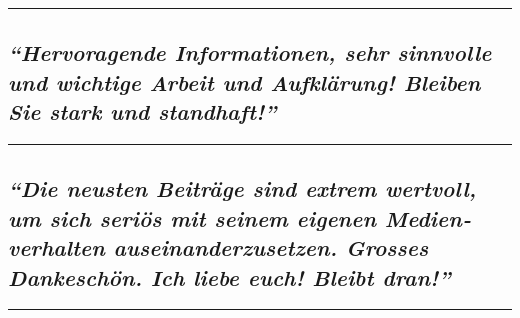 \begin{center}\rule{0.5\linewidth}{\linethickness}\end{center}

\hypertarget{hervoragende-informationen-sehr-sinnvolle-und-wichtige-arbeit-und-aufkluxe4rung-bleiben-sie-stark-und-standhaft}{%
\subsection{\texorpdfstring{\emph{``Hervoragende Informationen, sehr
sinnvolle und wichtige Arbeit und Aufklärung! Bleiben Sie stark und
standhaft!''}}{``Hervoragende Informationen, sehr sinnvolle und wichtige Arbeit und Aufklärung! Bleiben Sie stark und standhaft!''}}\label{hervoragende-informationen-sehr-sinnvolle-und-wichtige-arbeit-und-aufkluxe4rung-bleiben-sie-stark-und-standhaft}}

\begin{center}\rule{0.5\linewidth}{\linethickness}\end{center}

\hypertarget{die-neusten-beitruxe4ge-sind-extrem-wertvoll-um-sich-seriuxf6s-mit-seinem-eigenen-medienverhalten-auseinanderzusetzen-grosses-dankeschuxf6n-ich-liebe-euch-bleibt-dran}{%
\subsection{\texorpdfstring{\emph{``Die neusten Beiträge sind extrem
wertvoll, um sich seriös mit seinem eigenen Medien­verhalten
ausei­nander­zu­setzen. Grosses Dankeschön. Ich liebe euch! Bleibt
dran!''}}{``Die neusten Beiträge sind extrem wertvoll, um sich seriös mit seinem eigenen Medien­verhalten ausei­nander­zu­setzen. Grosses Dankeschön. Ich liebe euch! Bleibt dran!''}}\label{die-neusten-beitruxe4ge-sind-extrem-wertvoll-um-sich-seriuxf6s-mit-seinem-eigenen-medienverhalten-auseinanderzusetzen-grosses-dankeschuxf6n-ich-liebe-euch-bleibt-dran}}

\begin{center}\rule{0.5\linewidth}{\linethickness}\end{center}

